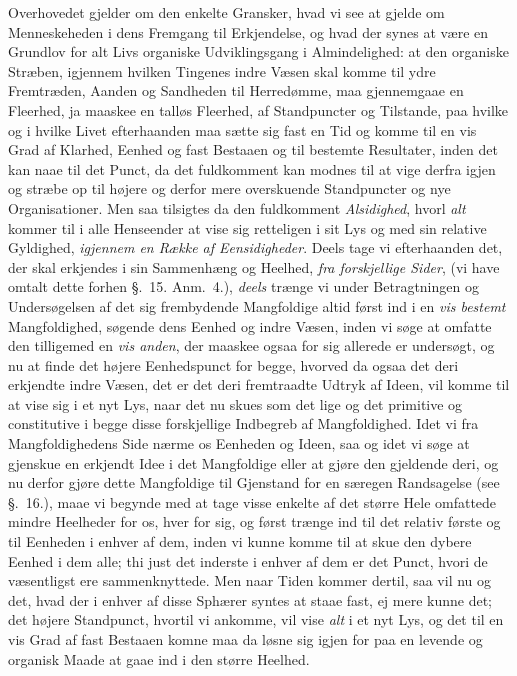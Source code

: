 \documentclass[12pt,a4paper]{book}
\newcommand{\apage}[1]{\marginnote{\footnotesize\textit{[#1]}}}
\begin{document}
Overhovedet gjelder om den enkelte
Gransker, hvad vi see at gjelde om Menneskeheden i dens Fremgang til Erkjendelse,
og hvad der synes at være en Grundlov for alt Livs organiske Udviklingsgang i
Almindelighed: at den organiske Stræben, igjennem hvilken Tingenes indre Væsen skal
komme til ydre Fremtræden, Aanden og Sandheden til Herredømme, maa gjennemgaae en
Fleerhed, ja maaskee en talløs Fleerhed, af Standpuncter og Tilstande, paa hvilke
og i hvilke Livet efterhaanden maa sætte sig fast en Tid og komme til en vis Grad
af Klarhed, Eenhed og fast Bestaaen og til bestemte Resultater, inden det kan naae
til det Punct, da det fuldkomment kan modnes til at vige derfra igjen og stræbe op
til højere og derfor mere overskuende Standpuncter og nye Organisationer. Men saa
tilsigtes da den  \apage{182} fuldkomment \emph{Alsidighed}, hvorl \emph{alt} kommer til i alle
Henseender at vise sig retteligen i sit Lys og med sin relative Gyldighed, \emph{igjennem
en Række af Eensidigheder}. Deels tage vi efterhaanden det, der skal
erkjendes i sin Sammenhæng og Heelhed, \emph{fra forskjellige Sider}, (vi have omtalt
dette forhen §.~15. Anm.~4.), \emph{deels} trænge vi under Betragtningen og Undersøgelsen
af det sig frembydende Mangfoldige altid først ind i en \emph{vis bestemt}
Mangfoldighed, søgende dens Eenhed og indre Væsen, inden vi søge at omfatte den
tilligemed en \emph{vis anden}, der maaskee ogsaa for sig allerede er undersøgt, og nu at
finde det højere Eenhedspunct for begge, hvorved da ogsaa det deri erkjendte indre
Væsen, det er det deri fremtraadte Udtryk af Ideen, vil komme til at vise sig i et
nyt Lys, naar det nu skues som det lige og det primitive og constitutive i begge
disse forskjellige Indbegreb af Mangfoldighed. Idet vi fra Mangfoldighedens Side
nærme os Eenheden og Ideen, saa og idet vi søge at gjenskue en erkjendt Idee i det
Mangfoldige eller at gjøre den gjeldende deri, og nu derfor gjøre dette Mangfoldige
til Gjenstand for en særegen Randsagelse (see §.~16.), maae vi begynde med at tage
visse enkelte af det større Hele omfattede mindre Heelheder for os, hver for sig,
og først trænge ind til det relativ første og til Eenheden i enhver af dem, inden
vi kunne komme \apage{183}  til at skue den dybere Eenhed i dem alle; thi just det inderste i
enhver af dem er det Punct, hvori de væsentligst ere sammenknyttede. Men naar
Tiden kommer dertil, saa vil nu og det, hvad der i enhver af disse Sphærer syntes
at staae fast, ej mere kunne det; det højere Standpunct, hvortil vi ankomme, vil
vise \emph{alt} i et nyt Lys, og det til en vis Grad af fast Bestaaen komne maa da løsne
sig igjen for paa en levende og organisk Maade at gaae ind i den større Heelhed.
\end{document}

